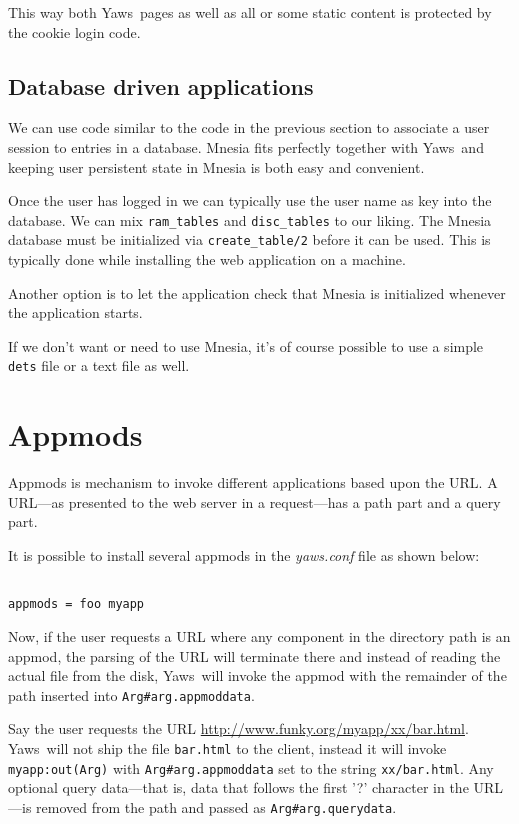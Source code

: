 \documentclass[11pt,oneside,english]{book}
\newcommand{\Yaws}            %
        {{\sc Yaws}}
\begin{document}
This way both \Yaws\  pages as well as all or some static content
is protected by the cookie login code.

\subsection{Database driven applications}

We can use code similar to the code in the previous section to associate
a user session to entries in a database. Mnesia fits perfectly
together with \Yaws\  and keeping user persistent state in Mnesia is
both easy and convenient.

Once the user has logged in we can typically use the user name as key
into the database. We can mix \verb+ram_tables+ and \verb+disc_tables+
to our liking. The Mnesia database must be initialized via
\verb+create_table/2+ before it can be used. This is typically done
while installing the web application on a machine.

Another option is to let the application check that Mnesia
is initialized whenever the application starts.

If we don't want or need to use Mnesia, it's of course possible
to use a simple \verb+dets+ file or a text file as well.

\section{Appmods}
\label{appmods}

Appmods is mechanism to invoke different applications based upon the
URL. A URL---as presented to the web server in a request---has a path
part and a query part.

It is possible to install several appmods in the \textit{yaws.conf}
file as shown below:

\begin{verbatim}

appmods = foo myapp

\end{verbatim}

Now, if the user requests a URL where any component in the
directory path is an appmod, the parsing of the URL will terminate
there and instead of reading the actual file from the disk, \Yaws\  will
invoke the appmod with the remainder of the path inserted into
\verb+Arg#arg.appmoddata+.

Say the user requests the URL
\url{http://www.funky.org/myapp/xx/bar.html}.  \Yaws\ will not ship
the file \verb+bar.html+ to the client, instead it will invoke
\verb+myapp:out(Arg)+ with \verb+Arg#arg.appmoddata+ set to the string
\verb+xx/bar.html+. Any optional query data---that is, data that
follows the first '?' character in the URL---is removed from the path
and passed as \verb+Arg#arg.querydata+.
\end{document}
